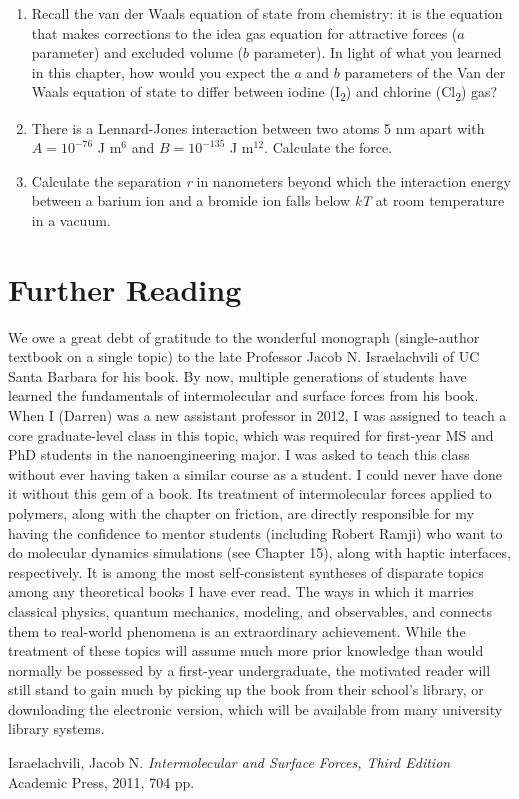 \begin{enumerate}
\item {Recall the van der Waals equation of state from chemistry: it is the equation that makes corrections to the idea gas equation for attractive forces ($a$ parameter) and excluded volume ($b$ parameter). In light of what you learned in this chapter, how would you expect the $a$ and $b$ parameters of the Van der Waals equation of state to differ between iodine (I\textsubscript{2}) and chlorine (Cl\textsubscript{2}) gas?}

\item {There is a Lennard-Jones interaction between two atoms 5 nm apart with $A=10^{-76}$ J m$^6$ and $B=10^{-135}$ J m$^{12}$. Calculate the force.}

\item {Calculate the separation \textit{r} in nanometers beyond which the interaction energy between a barium ion and a bromide ion falls below \textit{kT} at room temperature in a vacuum.}

\end{enumerate}

\section{Further Reading}

We owe a great debt of gratitude to the wonderful monograph (single-author textbook on a single topic) to the late Professor Jacob N. Israelachvili of UC Santa Barbara for his book. By now, multiple generations of students have learned the fundamentals of intermolecular and surface forces from his book. When I (Darren) was a new assistant professor in 2012, I was assigned to teach a core graduate-level class in this topic, which was required for first-year MS and PhD students in the nanoengineering major. I was asked to teach this class without ever having taken a similar course as a student. I could never have done it without this gem of a book. Its treatment of intermolecular forces applied to polymers, along with the chapter on friction, are directly responsible for my having the confidence to mentor students (including Robert Ramji) who want to do molecular dynamics simulations (see Chapter 15), along with haptic interfaces, respectively. It is among the most self-consistent syntheses of disparate topics among any theoretical books I have ever read. The ways in which it marries classical physics, quantum mechanics, modeling, and observables, and connects them to real-world phenomena is an extraordinary achievement. While the treatment of these topics will assume much more prior knowledge than would normally be possessed by a first-year undergraduate, the motivated reader will still stand to gain much by picking up the book from their school's library, or downloading the electronic version, which will be available from many university library systems.

\vspace{6mm}

Israelachvili, Jacob N. \textit{Intermolecular and Surface Forces, Third Edition} Academic Press, 2011, 704 pp.


